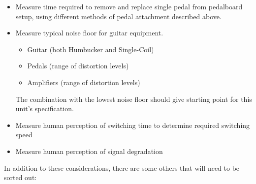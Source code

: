 \documentclass{article}
\begin{document}
\begin{itemize}
    \item
        Measure time required to remove and replace single pedal from pedalboard setup, using different methods of pedal attachment described above.
    \item
        Measure typical noise floor for guitar equipment.
        \begin{itemize}
            \item Guitar (both Humbucker and Single-Coil)
            \item Pedals (range of distortion levels)
            \item Amplifiers (range of distortion levels)
        \end{itemize}
        The combination with the lowest noise floor should give starting point for this unit's specification.
    \item
        Measure human perception of switching time to determine required switching speed
    \item
        Measure human perception of signal degradation 
\end{itemize}

In addition to these considerations, there are some others that will need to be sorted out:
\end{document}
